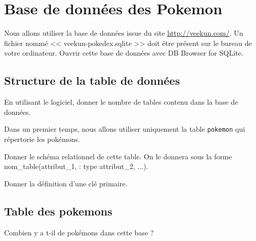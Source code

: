 
\section*{Base de données des Pokemon}
\label{sec:bdd}

Nous allons utiliser la base de données issue du site \url{http://veekun.com/}. Un fichier nommé << veekun-pokedex.sqlite >> doit être présent sur le bureau de votre ordinateur. Ouvrir cette base de données avec DB Browser for SQLite.


%

\subsection*{Structure de la table de données}

\question{}
En utilisant le logiciel, donner le nombre de tables contenu dans la base de données. 



Dans un premier temps, nous allons utiliser uniquement la table \texttt{pokemon} qui répertorie les pokémons.

\question{}
Donner le schéma relationnel de cette table. On le donnera sous la forme nom\_table(attribut\_1, : type attribut_2, ...).

\question{}
Donner la définition d'une clé primaire.

\subsection*{Table des pokemons}


\question{}
Combien y a t-il de pokémons dans cette base ?






